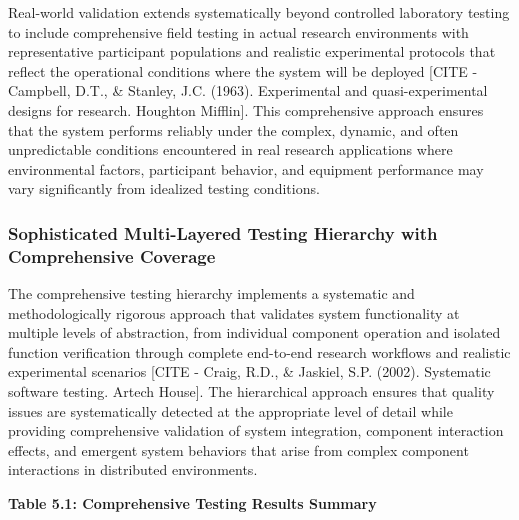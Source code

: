 \documentclass[12pt,a4paper]{report}
\begin{document}
Real-world validation extends systematically beyond controlled laboratory testing to include comprehensive field testing
in actual research environments with representative participant populations and realistic experimental protocols that
reflect the operational conditions where the system will be
deployed [CITE - Campbell, D.T., \& Stanley, J.C. (1963). Experimental and quasi-experimental designs for research. Houghton Mifflin].
This comprehensive approach ensures that the system performs reliably under the complex, dynamic, and often
unpredictable conditions encountered in real research applications where environmental factors, participant behavior,
and equipment performance may vary significantly from idealized testing conditions.

\subsubsection{Sophisticated Multi-Layered Testing Hierarchy with Comprehensive Coverage}

The comprehensive testing hierarchy implements a systematic and methodologically rigorous approach that validates system
functionality at multiple levels of abstraction, from individual component operation and isolated function verification
through complete end-to-end research workflows and realistic experimental
scenarios [CITE - Craig, R.D., \& Jaskiel, S.P. (2002). Systematic software testing. Artech House]. The hierarchical
approach ensures that quality issues are systematically detected at the appropriate level of detail while providing
comprehensive validation of system integration, component interaction effects, and emergent system behaviors that arise
from complex component interactions in distributed environments.

\textbf{Table 5.1: Comprehensive Testing Results Summary}
\end{document}
